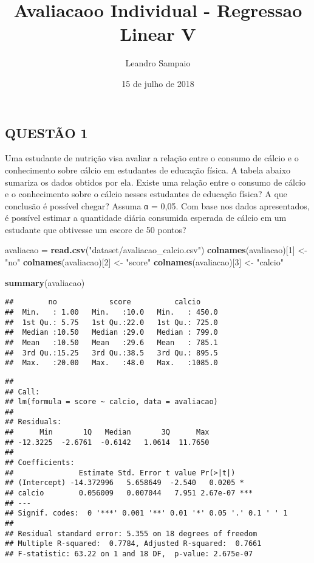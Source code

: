 \documentclass[]{article}
\title{Avaliacaoo Individual - Regressao Linear V}
\author{Leandro Sampaio}
\date{15 de julho de 2018}
\newenvironment{Shaded}{\begin{snugshade}}{\end{snugshade}}
\newcommand{\KeywordTok}[1]{\textcolor[rgb]{0.13,0.29,0.53}{\textbf{#1}}}
\newcommand{\DecValTok}[1]{\textcolor[rgb]{0.00,0.00,0.81}{#1}}
\newcommand{\StringTok}[1]{\textcolor[rgb]{0.31,0.60,0.02}{#1}}
\newcommand{\NormalTok}[1]{#1}
\begin{document}
\maketitle

\subsection{QUESTÃO 1}\label{questao-1}

Uma estudante de nutrição visa avaliar a relação entre o consumo de
cálcio e o conhecimento sobre cálcio em estudantes de educação física. A
tabela abaixo sumariza os dados obtidos por ela. Existe uma relação
entre o consumo de cálcio e o conhecimento sobre o cálcio nesses
estudantes de educação física? A que conclusão é possível chegar? Assuma
α = 0,05. Com base nos dados apresentados, é possível estimar a
quantidade diária consumida esperada de cálcio em um estudante que
obtivesse um escore de 50 pontos?

\begin{Shaded}
\begin{Highlighting}[]
\NormalTok{avaliacao =}\StringTok{ }\KeywordTok{read.csv}\NormalTok{(}\StringTok{"dataset/avaliacao_calcio.csv"}\NormalTok{)}
\KeywordTok{colnames}\NormalTok{(avaliacao)[}\DecValTok{1}\NormalTok{] <-}\StringTok{ "no"}
\KeywordTok{colnames}\NormalTok{(avaliacao)[}\DecValTok{2}\NormalTok{] <-}\StringTok{ "score"}
\KeywordTok{colnames}\NormalTok{(avaliacao)[}\DecValTok{3}\NormalTok{] <-}\StringTok{ "calcio"}

\KeywordTok{summary}\NormalTok{(avaliacao)}
\end{Highlighting}
\end{Shaded}

\begin{verbatim}
##        no            score          calcio      
##  Min.   : 1.00   Min.   :10.0   Min.   : 450.0  
##  1st Qu.: 5.75   1st Qu.:22.0   1st Qu.: 725.0  
##  Median :10.50   Median :29.0   Median : 799.0  
##  Mean   :10.50   Mean   :29.6   Mean   : 785.1  
##  3rd Qu.:15.25   3rd Qu.:38.5   3rd Qu.: 895.5  
##  Max.   :20.00   Max.   :48.0   Max.   :1085.0
\end{verbatim}

\begin{verbatim}
## 
## Call:
## lm(formula = score ~ calcio, data = avaliacao)
## 
## Residuals:
##      Min       1Q   Median       3Q      Max 
## -12.3225  -2.6761  -0.6142   1.0614  11.7650 
## 
## Coefficients:
##               Estimate Std. Error t value Pr(>|t|)    
## (Intercept) -14.372996   5.658649  -2.540   0.0205 *  
## calcio        0.056009   0.007044   7.951 2.67e-07 ***
## ---
## Signif. codes:  0 '***' 0.001 '**' 0.01 '*' 0.05 '.' 0.1 ' ' 1
## 
## Residual standard error: 5.355 on 18 degrees of freedom
## Multiple R-squared:  0.7784, Adjusted R-squared:  0.7661 
## F-statistic: 63.22 on 1 and 18 DF,  p-value: 2.675e-07
\end{verbatim}
\end{document}
